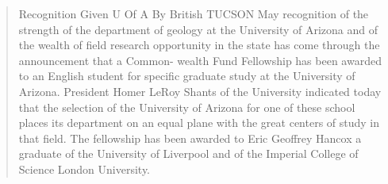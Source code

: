 \begin{quotation}
Recognition Given U Of A By British TUCSON May recognition of the strength of the department of geology at the University of Arizona and of the wealth of field research opportunity in the state has come through the announcement that a Common- wealth Fund Fellowship has been awarded to an English student for specific graduate study at the University of Arizona. President Homer LeRoy Shants of the University indicated today that the selection of the University of Arizona for one of these school places its department on an equal plane with the great centers of study in that field. The fellowship has been awarded to Eric Geoffrey Hancox a graduate of the University of Liverpool and of the Imperial College of Science London University.
\end{quotation}
